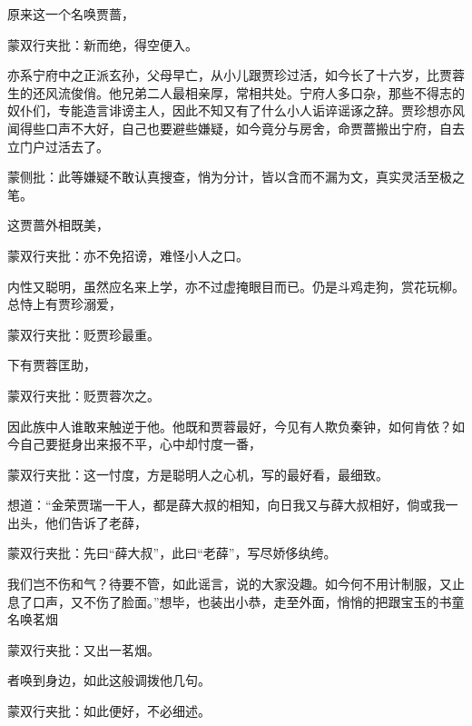 \begin{parag}


    原来这一个名唤贾蔷，\begin{note}蒙双行夹批：新而绝，得空便入。\end{note}亦系宁府中之正派玄孙，父母早亡，从小儿跟贾珍过活，如今长了十六岁，比贾蓉生的还风流俊俏。他兄弟二人最相亲厚，常相共处。宁府人多口杂，那些不得志的奴仆们，专能造言诽谤主人，因此不知又有了什么小人诟谇谣诼之辞。贾珍想亦风闻得些口声不大好，自己也要避些嫌疑，如今竟分与房舍，命贾蔷搬出宁府，自去立门户过活去了。\begin{note}蒙侧批：此等嫌疑不敢认真搜查，悄为分计，皆以含而不漏为文，真实灵活至极之笔。\end{note}这贾蔷外相既美，\begin{note}蒙双行夹批：亦不免招谤，难怪小人之口。\end{note}内性又聪明，虽然应名来上学，亦不过虚掩眼目而已。仍是斗鸡走狗，赏花玩柳。总恃上有贾珍溺爱，\begin{note}蒙双行夹批：贬贾珍最重。\end{note}下有贾蓉匡助，\begin{note}蒙双行夹批：贬贾蓉次之。\end{note}因此族中人谁敢来触逆于他。他既和贾蓉最好，今见有人欺负秦钟，如何肯依？如今自己要挺身出来报不平，心中却忖度一番，\begin{note}蒙双行夹批：这一忖度，方是聪明人之心机，写的最好看，最细致。\end{note}想道：“金荣贾瑞一干人，都是薛大叔的相知，向日我又与薛大叔相好，倘或我一出头，他们告诉了老薛，\begin{note}蒙双行夹批：先曰“薛大叔”，此曰“老薛”，写尽娇侈纨绔。\end{note}我们岂不伤和气？待要不管，如此谣言，说的大家没趣。如今何不用计制服，又止息了口声，又不伤了脸面。”想毕，也装出小恭，走至外面，悄悄的把跟宝玉的书童名唤茗烟\begin{note}蒙双行夹批：又出一茗烟。\end{note}者唤到身边，如此这般调拨他几句。\begin{note}蒙双行夹批：如此便好，不必细述。\end{note}
\end{parag}


